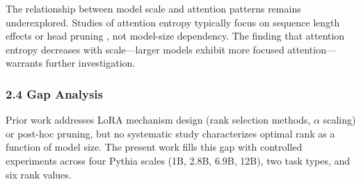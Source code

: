 The relationship between model scale and attention patterns remains underexplored. Studies of attention entropy typically focus on sequence length effects \citep{child2019sparse} or head pruning \citep{voita2019heads}, not model-size dependency. The finding that attention entropy decreases with scale---larger models exhibit more focused attention---warrants further investigation.

\subsubsection{2.4 Gap Analysis}

Prior work addresses LoRA mechanism design (rank selection methods, $\alpha$ scaling) or post-hoc pruning, but no systematic study characterizes optimal rank as a function of model size. The present work fills this gap with controlled experiments across four Pythia scales (1B, 2.8B, 6.9B, 12B), two task types, and six rank values.
